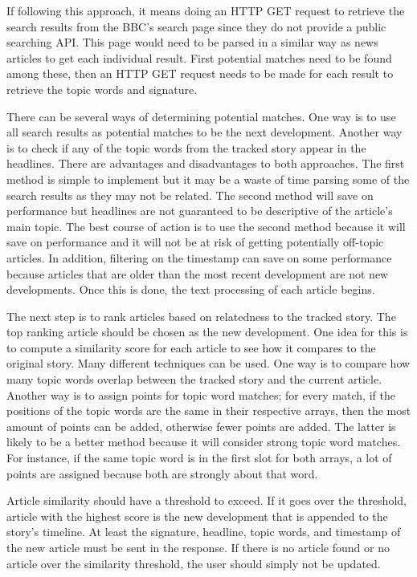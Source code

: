 \documentclass[11pt,titlepage]{report}
\begin{document}
If following this approach, it means doing an HTTP GET request to retrieve the search results from the BBC's search page since they do not provide a public searching API. This page would need to be parsed in a similar way as news articles to get each individual result. First potential matches need to be found among these, then an HTTP GET request needs to be made for each result to retrieve the topic words and signature.

There can be several ways of determining potential matches. One way is to use all search results as potential matches to be the next development. Another way is to check if any of the topic words from the tracked story appear in the headlines. There are advantages and disadvantages to both approaches. The first method is simple to implement but it may be a waste of time parsing some of the search results as they may not be related. The second method will save on performance but headlines are not guaranteed to be descriptive of the article's main topic. The best course of action is to use the second method because it will save on performance and it will not be at risk of getting potentially off-topic articles. In addition, filtering on the timestamp can save on some performance because articles that are older than the most recent development are not new developments. Once this is done, the text processing of each article begins.

The next step is to rank articles based on relatedness to the tracked story. The top ranking article should be chosen as the new development. One idea for this is to compute a similarity score for each article to see how it compares to the original story. Many different techniques can be used. One way is to compare how many topic words overlap between the tracked story and the current article. Another way is to assign points for topic word matches; for every match, if the positions of the topic words are the same in their respective arrays, then the most amount of points can be added, otherwise fewer points are added. The latter is likely to be a better method because it will consider strong topic word matches. For instance, if the same topic word is in the first slot for both arrays, a lot of points are assigned because both are strongly about that word. 

Article similarity should have a threshold to exceed. If it goes over the threshold, article with the highest score is the new development that is appended to the story's timeline. At least the signature, headline, topic words, and timestamp of the new article must be sent in the response. If there is no article found or no article over the similarity threshold, the user should simply not be updated. 
\end{document}
